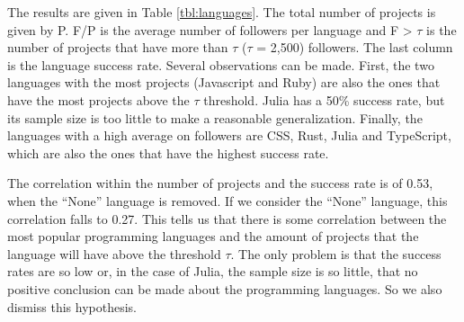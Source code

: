The results are given in Table \ref{tbl:languages}. The total number of projects is given by P. F/P is the average number of followers per language and F > {$ \tau $} is the number of projects that have more than {$ \tau $} ({$ \tau $} = 2,500) followers. The last column is the language success rate. Several observations can be made. First, the two languages with the most projects (Javascript and Ruby) are also the ones that have the most projects above the {$ \tau $} threshold. Julia has a 50\% success rate, but its sample size is too little to make a reasonable generalization. Finally, the languages with a high average on followers are CSS, Rust, Julia and TypeScript, which are also the ones that have the highest success rate.

The correlation within the number of projects and the success rate is of 0.53, when the ``None'' language is removed. If we consider the ``None'' language, this correlation falls to 0.27. This tells us that there is some correlation between the most popular programming languages and the amount of projects that the language will have above the threshold {$ \tau $}. The only problem is that the success rates are so low or, in the case of Julia, the sample size is so little, that no positive conclusion can be made about the programming languages. So we also dismiss this hypothesis.
